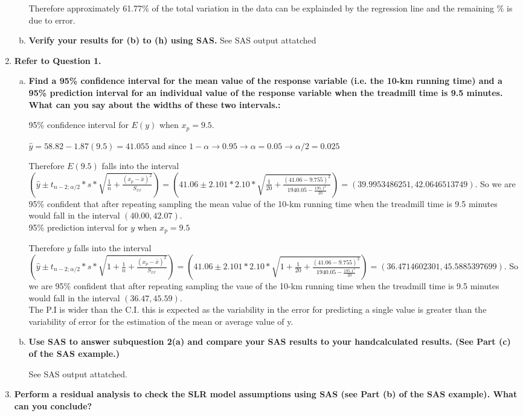 \documentclass{article}
\begin{document}
\begin{enumerate}[1.]
\begin{enumerate}[(a)]
Therefore approximately 61.77\% of the total variation in the data can be explainded by the regression line and the remaining \% is due to error.

  \item \textbf{Verify your results for (b) to (h) using SAS.}
See SAS output attatched


\end{enumerate}

\item \textbf{Refer to Question 1.}
\begin{enumerate}[(a)]
\item \textbf{Find a 95\% confidence interval for the mean
value of the response variable (i.e. the 10-km running time) and a 95\% prediction
interval for an individual value of the response variable when the treadmill time is 9.5
minutes. What can you say about the widths of these two intervals.:}


95\% confidence interval for $E(y)$ when $x_p =9.5$. 

$\hat{y} = 58.82 - 1.87(9.5) = 41.055$ and since $1 - \alpha \to 0.95 \to \alpha = 0.05 \to \alpha/2 = 0.025$

Therefore $E(9.5)$ falls into the interval $(\hat{y} \pm t_{n-2;\alpha/2} * s * \sqrt{ \frac{1}{n} + \frac{(x_p - \bar{x})^2}{S_{xx}}}) = (41.06 \pm 2.101 * 2.10 * \sqrt{\frac{1}{20} + \frac{(41.06 - 9.755)^2}{ 1940.05 - \frac{195.1^2}{20}} }) = (39.9953486251, 42.0646513749)$. So we are 95\% confident that after repeating sampling the mean value of the 10-km running time when the treadmill time is 9.5 minutes would fall in the interval $(40.00, 42.07)$. \\

95\% prediction interval for $y$ when $x_p = 9.5$

Therefore $y$ falls into the interval $(\hat{y} \pm t_{n-2;\alpha/2} * s * \sqrt{ 1+ \frac{1}{n} + \frac{(x_p - \bar{x})^2}{S_{xx}}}) = (41.06 \pm 2.101 * 2.10 * \sqrt{1 + \frac{1}{20} + \frac{(41.06 - 9.755)^2}{ 1940.05 - \frac{195.1^2}{20}} }) = (36.4714602301, 45.5885397699)$. So we are 95\% confident that after repeating sampling the vaue of the 10-km running time when the treadmill time is 9.5 minutes would fall in the interval $(36.47, 45.59)$. \\

The P.I is wider than the C.I. this is expected as the variability in the error for predicting a single value is greater than the variability of error for the estimation of the mean or average value of y.

\item \textbf{Use SAS to answer subquestion 2(a) and compare your SAS results to your handcalculated results. (See Part (c) of the SAS example.)}

See SAS output attatched.

\end{enumerate}

\item \textbf{Perform a residual analysis to check the SLR model assumptions using SAS (see Part (b) of
the SAS example). What can you conclude?}

\end{enumerate}
\end{document}
